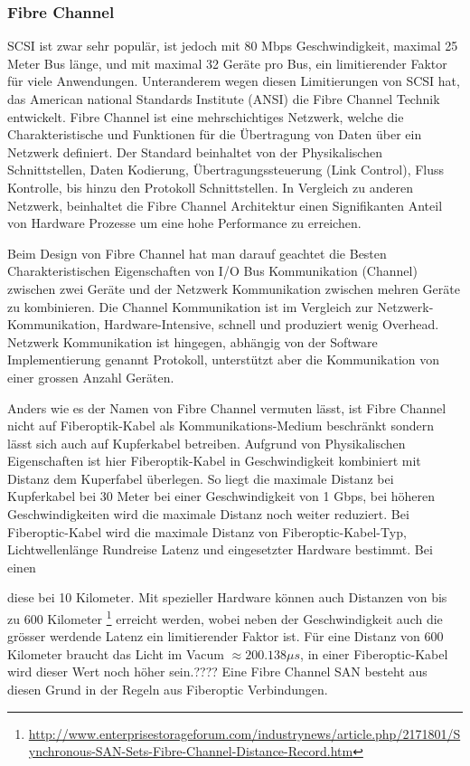 \subsubsection{Fibre Channel}
SCSI ist zwar sehr populär, ist jedoch mit  80 Mbps Geschwindigkeit, maximal 25 Meter Bus länge, und mit maximal 32 Geräte pro Bus, ein limitierender Faktor für viele Anwendungen. Unteranderem wegen diesen Limitierungen von SCSI hat, das American national Standards Institute (ANSI) die Fibre Channel Technik entwickelt. Fibre Channel ist eine mehrschichtiges Netzwerk, welche die Charakteristische und Funktionen für die Übertragung von Daten über ein Netzwerk definiert. Der Standard beinhaltet von der Physikalischen Schnittstellen, Daten Kodierung, Übertragungssteuerung (Link Control), Fluss Kontrolle, bis hinzu den Protokoll Schnittstellen. In Vergleich zu anderen Netzwerk, beinhaltet die Fibre Channel Architektur einen Signifikanten Anteil von Hardware Prozesse um eine hohe Performance zu erreichen.\cite{Gupta2002}\cite{Christopher2009}

Beim Design von Fibre Channel hat man darauf geachtet die Besten Charakteristischen Eigenschaften von I/O Bus Kommunikation (Channel) zwischen zwei Geräte und der Netzwerk Kommunikation zwischen mehren Geräte zu kombinieren. Die Channel Kommunikation ist im Vergleich zur Netzwerk- Kommunikation, Hardware-Intensive, schnell und produziert wenig Overhead. Netzwerk Kommunikation ist hingegen, abhängig von der Software Implementierung genannt Protokoll, unterstützt aber die Kommunikation von einer grossen Anzahl Geräten.

Anders wie es der Namen von Fibre Channel vermuten lässt, ist Fibre Channel nicht auf Fiberoptik-Kabel als Kommunikations-Medium beschränkt sondern lässt sich auch auf Kupferkabel betreiben. Aufgrund von Physikalischen Eigenschaften ist hier Fiberoptik-Kabel in Geschwindigkeit kombiniert mit Distanz dem Kuperfabel überlegen. So liegt die maximale Distanz bei Kupferkabel bei 30 Meter bei einer Geschwindigkeit von 1 Gbps, bei höheren Geschwindigkeiten wird die maximale Distanz noch weiter reduziert. Bei Fiberoptic-Kabel wird die maximale Distanz von Fiberoptic-Kabel-Typ, Lichtwellenlänge Rundreise Latenz und eingesetzter Hardware bestimmt. Bei einen 


diese bei 10 Kilometer. Mit spezieller Hardware können auch Distanzen von bis zu 600 Kilometer \footnote{\url{http://www.enterprisestorageforum.com/industrynews/article.php/2171801/Synchronous-SAN-Sets-Fibre-Channel-Distance-Record.htm}} erreicht werden, wobei neben der Geschwindigkeit auch die grösser werdende Latenz ein limitierender Faktor ist. Für eine Distanz von 600 Kilometer braucht das Licht im Vacum $ \approx 200.138\mu s$, in einer Fiberoptic-Kabel wird dieser Wert noch höher sein.????
Eine Fibre Channel SAN besteht aus diesen Grund in der Regeln aus Fiberoptic  Verbindungen.

